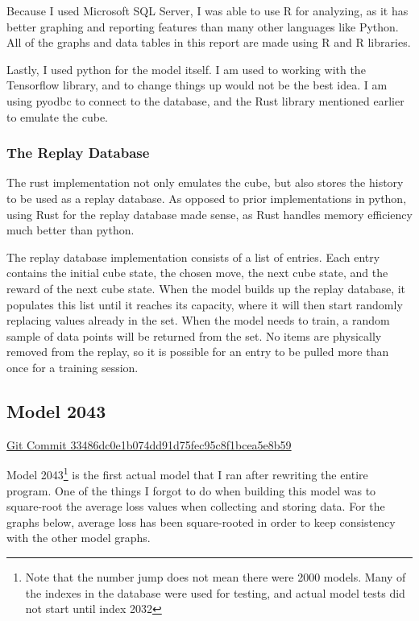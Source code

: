\documentclass[12pt]{article}
\begin{document}
Because I used Microsoft SQL Server, I was able to use R for analyzing, as it has better graphing and reporting features than many other languages like Python. All of the graphs and data tables in this report are made using R and R libraries.

Lastly, I used python for the model itself. I am used to working with the Tensorflow library, and to change things up would not be the best idea. I am using pyodbc to connect to the database, and the Rust library mentioned earlier to emulate the cube.

\subsubsection{The Replay Database}

The rust implementation not only emulates the cube, but also stores the history to be used as a replay database. As opposed to prior implementations in python, using Rust for the replay database made sense, as Rust handles memory efficiency much better than python.

The replay database implementation consists of a list of entries. Each entry contains the initial cube state, the chosen move, the next cube state, and the reward of the next cube state. When the model builds up the replay database, it populates this list until it reaches its capacity, where it will then start randomly replacing values already in the set. When the model needs to train, a random sample of data points will be returned from the set. No items are physically removed from the replay, so it is possible for an entry to be pulled more than once for a training session.

\newpage

\subsection{Model 2043}

\href{https://www.github.com/LittleTealeaf/mlcube/tree/33486dc0e1b074dd91d75fec95c8f1bcea5e8b59}{Git Commit 33486dc0e1b074dd91d75fec95c8f1bcea5e8b59}


Model 2043\footnote{Note that the number jump does not mean there were 2000 models. Many of the indexes in the database were used for testing, and actual model tests did not start until index 2032} is the first actual model that I ran after rewriting the entire program. One of the things I forgot to do when building this model was to square-root the average loss values when collecting and storing data. For the graphs below, average loss has been square-rooted in order to keep consistency with the other model graphs.
\end{document}
